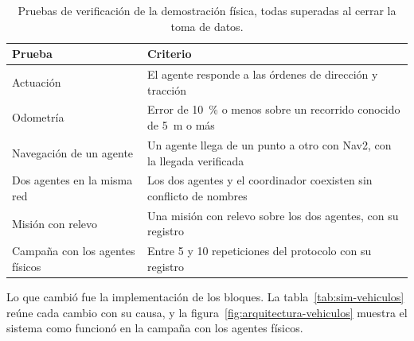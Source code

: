 \label{sec:pruebas-verificacion}
\begin{table}[H]
  \centering\footnotesize{}
  \caption{Pruebas de verificación de la demostración física, todas superadas al cerrar la toma de datos.}
  \label{tab:pruebas-verificacion}
  \begin{tabular}{@{}>{\raggedright\arraybackslash}p{}>{\raggedright\arraybackslash}p{}@{}}
    \toprule
    \textbf{Prueba} & \textbf{Criterio} \\ \midrule
    Actuación & El agente responde a las órdenes de dirección y tracción \\
    Odometría & Error de 10~\% o menos sobre un recorrido conocido de 5~m o más \\
    Navegación de un agente & Un agente llega de un punto a otro con Nav2, con la llegada verificada \\
    Dos agentes en la misma red & Los dos agentes y el coordinador coexisten sin conflicto de nombres \\
    Misión con relevo & Una misión con relevo sobre los dos agentes, con su registro \\
    Campaña con los agentes físicos & Entre 5 y 10 repeticiones del protocolo con su registro \\ \bottomrule
  \end{tabular}
\end{table}

Lo que cambió fue la implementación de los bloques. La tabla~\ref{tab:sim-vehiculos} reúne cada cambio con su causa, y la figura~\ref{fig:arquitectura-vehiculos} muestra el sistema como funcionó en la campaña con los agentes físicos.

